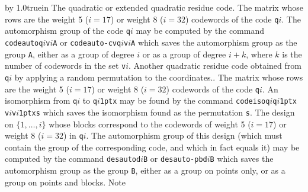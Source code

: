 {\advance\leftskip by 1.0truein\relax
   \noindent{}The quadratic or extended
                      quadratic residue code.
   \medbreak
   \noindent{}The matrix whose rows are
                   the weight 5 ($i = 17$) or weight 8 ($i = 32$) codewords
                   of the code {\tt q}\kern1pt$i$.  The automorphism group of the code
                   {\tt q}\kern1pt$i$ may be computed by the command
   \smallskip
   \hskip0.4in{\tt codeauto\quad q\kern1pt$i$\quad v\kern1pt$i$\quad A}
   \smallskip
   or
   \smallskip
   \hskip0.4in{\tt codeauto\quad -cv\quad q\kern1pt$i$\quad v\kern1pt$i$\quad A}
   \smallskip
          which saves the automorphism group as the group {\tt A},
          either as a group of degree $i$ or as a group of degree
          $i+k$, where $k$ is the number of codewords in the set {\tt v}\kern1pt$i$.
   \medbreak
   \noindent{}Another quadratic residue
                     code obtained from
                     {\tt q}\kern1pt$i$ by applying a random permutation to the
                      coordinates..
   \medbreak
   \noindent{}The matrix whose rows are
                   the weight 5 ($i = 17$) or weight 8 ($i = 32$) codewords
                   of the code {\tt q}\kern1pt$i$.  An isomorphism from
                   {\tt q}\kern1pt$i$ to {\tt q\kern1pt$i$\kern1ptx}
                   may be found by the command
   \smallskip
   \hskip0.4in{\tt codeiso\quad q\kern1pt$i$\quad q\kern1pt$i$\kern1ptx\quad
                v\kern1pt$i$\quad v\kern1pt$i$\kern1ptx\quad s}
   \smallskip
          which saves the isomorphism found as the permutation {\tt s}.
   \medbreak
   \noindent{}The design on $\{1,\ldots,i\}$
                     whose blocks correspond to the codewords of
                     weight 5 ($i = 17$) or weight 8 ($i = 32$) in {\tt q}\kern1pt$i$.
                     The automorphism group of this design (which must
                     contain the group of the corresponding code, and which
                     in fact equals it) may be computed by the command
   \smallskip
   \hskip0.4in{\tt desauto\quad d\kern1pt$i$\quad B}
   \smallskip
   or
   \smallskip
   \hskip0.4in{\tt desauto\quad -pb\quad d\kern1pt$i$\quad B}
   \smallskip
          which saves the automorphism group as the group {\tt B}, either as a
          group on points only, or as a group on points and blocks.  Note
}
